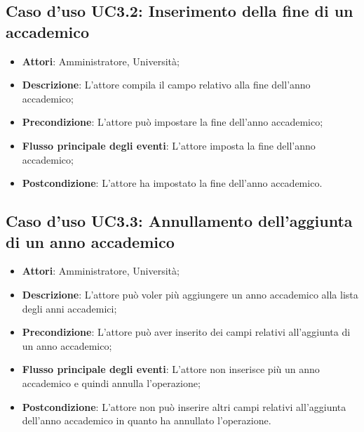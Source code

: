 \subsection{Caso d'uso \texorpdfstring{UC3.2}{UC3.2}: Inserimento della fine di un accademico}
\begin{itemize}
\item \textbf{Attori}: Amministratore, Università;
\item \textbf{Descrizione}: L'attore compila il campo relativo alla fine dell'anno accademico;
\item \textbf{Precondizione}: L'attore può impostare la fine dell'anno accademico;
\item \textbf{Flusso principale degli eventi}: L'attore imposta la fine dell'anno accademico;
\item \textbf{Postcondizione}: L'attore ha impostato la fine dell'anno accademico.
\end{itemize}
\subsection{Caso d'uso \texorpdfstring{UC3.3}{UC3.3}: Annullamento dell'aggiunta di un anno accademico}
\begin{itemize}
\item \textbf{Attori}: Amministratore, Università;
\item \textbf{Descrizione}: L'attore può voler più aggiungere un anno accademico alla lista degli anni accademici;
\item \textbf{Precondizione}: L'attore può aver inserito dei campi relativi all'aggiunta di un anno accademico;
\item \textbf{Flusso principale degli eventi}: L'attore non inserisce più un anno accademico e quindi annulla l'operazione;
\item \textbf{Postcondizione}: L'attore non può inserire altri campi relativi all'aggiunta dell'anno accademico in quanto ha annullato l'operazione.
\end{itemize}
